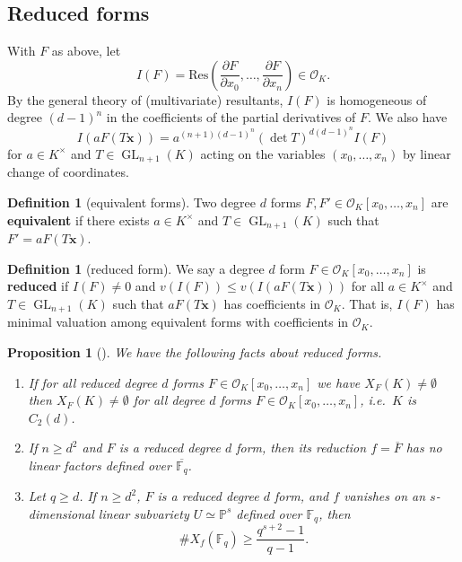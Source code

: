 \documentclass{amsart}
\newcommand{\F}{\mathbb{F}}
\renewcommand{\P}{\mathbb{P}}
\renewcommand{\O}{\mathcal{O}}
\DeclareMathOperator{\GL}{GL}
\newtheorem{proposition}[theorem]{Proposition}
\theoremstyle{definition}
\newtheorem{definition}[theorem]{Definition}
\numberwithin{equation}{section}
\numberwithin{table}{section}
\newcommand{\qboundgeq}[1]{{\color{cyan}$q \geq {#1}$}}
\renewcommand{\qboundgeq}[1]{{$q \geq {#1}$}}
\begin{document}
\subsection{Reduced forms}
\label{sec:reduced_forms}

With $F$ as above, let 
\[I(F) = \mathrm{Res}\left(\frac{\partial F}{\partial x_0}, \ldots, \frac{\partial F}{\partial x_n}\right) \in \O_K.\]
By the general theory of (multivariate) resultants, $I(F)$ is homogeneous of degree $(d-1)^{n}$ in the coefficients of the partial derivatives of $F$. We also have \cite[Lemma 5]{LaxtonLewis1965}
\[I(aF(T\mathbf{x})) = a^{(n+1)(d-1)^n}(\det T)^{d(d-1)^n}I(F)\]
for $a \in K^\times$ and $T \in \GL_{n+1}(K)$ acting on the variables $(x_0, \ldots, x_n)$ by linear change of coordinates.

\begin{definition}[equivalent forms]
    Two degree $d$ forms $F,F' \in \O_K[x_0, \ldots, x_n]$ are \textbf{equivalent} if there exists $a \in K^\times$ and $T \in \GL_{n+1}(K)$ such that $F' = aF(T\mathbf{x})$.
\end{definition}

\begin{definition}[reduced form]
    We say a degree $d$ form $F \in \O_K[x_0, \ldots, x_n]$ is \textbf{reduced} if $I(F) \neq 0$ and 
    $v(I(F)) \leq v(I(aF(T\mathbf{x})))$ for all $a \in K^\times$ and $T \in \GL_{n+1}(K)$ such that $aF(T\mathbf{x})$ has coefficients in $\O_K$. That is, $I(F)$ has minimal valuation among equivalent forms with coefficients in $\O_K$. 
\end{definition}

\begin{proposition}[{\cite{LaxtonLewis1965, LeepYeomans1996_quintic_forms}}]
\label{prop:reduced_facts}
    We have the following facts about reduced forms.
    \begin{enumerate}[label = (\roman*)]
        \item If for all \textit{reduced} degree $d$ forms $F \in \O_K[x_0, \ldots, x_n]$ we have $X_F(K) \neq \emptyset$ then $X_F(K) \neq \emptyset$ for all degree $d$ forms $F \in \O_K[x_0, \ldots, x_n]$, i.e.\ $K$ is $C_2(d)$.

        \item If $n \geq d^2$ and $F$ is a reduced degree $d$ form, then its reduction $f = \overline{F}$ has no linear factors defined over $\overline{\F_q}$.

        \item Let \qboundgeq{d}. If $n \geq d^2$, $F$ is a reduced degree $d$ form, and $f$ vanishes on an $s$-dimensional linear subvariety $U \simeq \P^s$ defined over $\F_q$, then
        \[\#X_f(\F_q) \geq \frac{q^{s+2} - 1}{q-1}.\]
    \end{enumerate}
\end{proposition}
\end{document}

